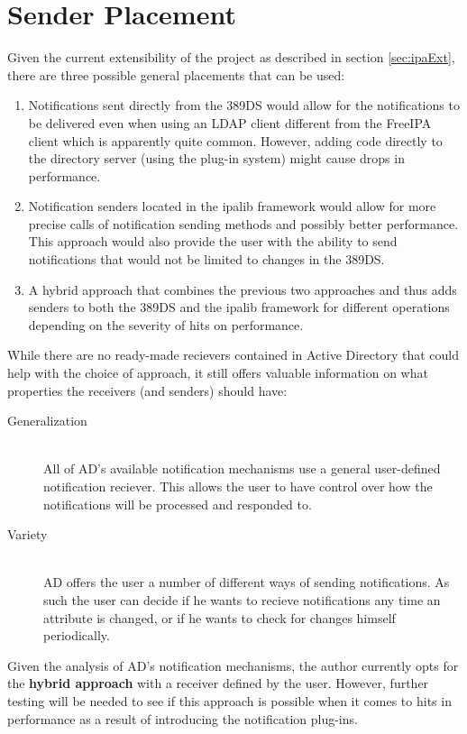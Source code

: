\section{Sender Placement}
Given the current extensibility of the project as described in section \ref{sec:ipaExt},
there are three possible general placements that can be used:

\begin{enumerate}
    \item Notifications sent directly from the 389DS would allow for the notifications to be delivered even when using an LDAP client different from the FreeIPA client which is apparently quite common.
    However, adding code directly to the directory server (using the plug-in system) might cause drops in performance.
    \item Notification senders located in the ipalib framework would allow for more precise calls of notification sending methods and possibly better performance.
    This approach would also provide the user with the ability to send notifications that would not be limited to changes in the 389DS.
    \item A hybrid approach that combines the previous two approaches and thus adds senders to both the 389DS and the ipalib framework for different operations depending on the severity of hits on performance.
\end{enumerate}

While there are no ready-made recievers contained in Active Directory that could help with the choice of approach, it still offers valuable information on what properties the receivers (and senders) should have:

\begin{description}
    \item[Generalization]\hfill \\
        All of AD's available notification mechanisms use a general user-defined notification reciever.
        This allows the user to have control over how the notifications will be processed and responded to.
    \item[Variety]\hfill \\
        AD offers the user a number of different ways of sending notifications. As such the user can decide if he wants to recieve notifications any time an attribute is changed,
        or if he wants to check for changes himself periodically.
\end{description}

Given the analysis of AD's notification mechanisms, the author currently opts for the \textbf{hybrid approach} with a receiver defined by the user.
However, further testing will be needed to see if this approach is possible when it comes to hits in performance as a result of introducing the notification plug-ins.

